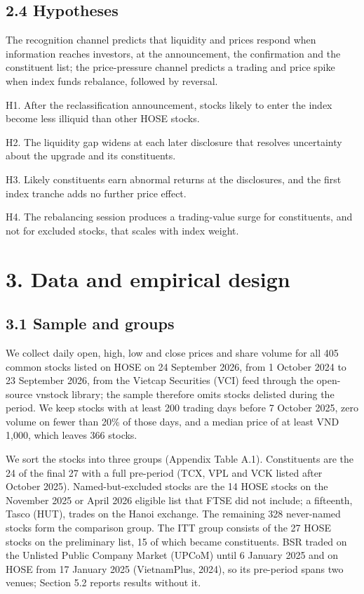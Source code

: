 \hypertarget{hypotheses}{%
\subsection{2.4 Hypotheses}\label{hypotheses}}

The recognition channel predicts that liquidity and prices respond when
information reaches investors, at the announcement, the confirmation and
the constituent list; the price-pressure channel predicts a trading and
price spike when index funds rebalance, followed by reversal.

H1. After the reclassification announcement, stocks likely to enter the
index become less illiquid than other HOSE stocks.

H2. The liquidity gap widens at each later disclosure that resolves
uncertainty about the upgrade and its constituents.

H3. Likely constituents earn abnormal returns at the disclosures, and
the first index tranche adds no further price effect.

H4. The rebalancing session produces a trading-value surge for
constituents, and not for excluded stocks, that scales with index
weight.

\hypertarget{data-and-empirical-design}{%
\section{3. Data and empirical design}\label{data-and-empirical-design}}

\hypertarget{sample-and-groups}{%
\subsection{3.1 Sample and groups}\label{sample-and-groups}}

We collect daily open, high, low and close prices and share volume for
all 405 common stocks listed on HOSE on 24 September 2026, from 1
October 2024 to 23 September 2026, from the Vietcap Securities (VCI)
feed through the open-source vnstock library; the sample therefore omits
stocks delisted during the period. We keep stocks with at least 200
trading days before 7 October 2025, zero volume on fewer than 20\% of
those days, and a median price of at least VND 1,000, which leaves 366
stocks.

We sort the stocks into three groups (Appendix Table A.1). Constituents
are the 24 of the final 27 with a full pre-period (TCX, VPL and VCK
listed after October 2025). Named-but-excluded stocks are the 14 HOSE
stocks on the November 2025 or April 2026 eligible list that FTSE did
not include; a fifteenth, Tasco (HUT), trades on the Hanoi exchange. The
remaining 328 never-named stocks form the comparison group. The ITT
group consists of the 27 HOSE stocks on the preliminary list, 15 of
which became constituents. BSR traded on the Unlisted Public Company
Market (UPCoM) until 6 January 2025 and on HOSE from 17 January 2025
(VietnamPlus, 2024), so its pre-period spans two venues; Section 5.2
reports results without it.

